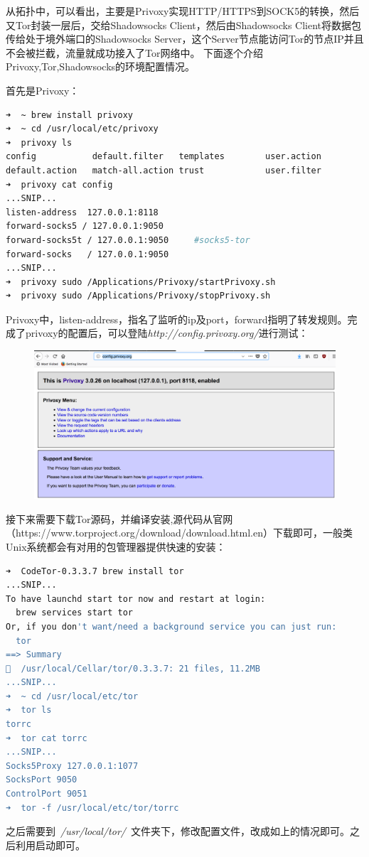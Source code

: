 \documentclass[12pt]{article}  %
\begin{document}
\par
从拓扑中，可以看出，主要是Privoxy实现HTTP/HTTPS到SOCK5的转换，然后又Tor封装一层后，交给Shadowsocks Client，然后由Shadowsocks Client将数据包传给处于境外端口的Shadowsocks Server，这个Server节点能访问Tor的节点IP并且不会被拦截，流量就成功接入了Tor网络中。
下面逐个介绍 Privoxy,Tor,Shadowsocks的环境配置情况。
\par
首先是Privoxy：
\begin{lstlisting}[language=sh]
➜  ~ brew install privoxy
➜  ~ cd /usr/local/etc/privoxy
➜  privoxy ls
config           default.filter   templates        user.action
default.action   match-all.action trust            user.filter
➜  privoxy cat config
...SNIP...
listen-address  127.0.0.1:8118
forward-socks5 / 127.0.0.1:9050
forward-socks5t / 127.0.0.1:9050     #socks5-tor
forward-socks   / 127.0.0.1:9050
...SNIP...
➜  privoxy sudo /Applications/Privoxy/startPrivoxy.sh
➜  privoxy sudo /Applications/Privoxy/stopPrivoxy.sh
\end{lstlisting}
\par
Privoxy中，listen-address，指名了监听的ip及port，forward指明了转发规则。完成了privoxy的配置后，可以登陆\emph{http://config.privoxy.org/}进行测试：
\begin{figure}[h]
\centering
\includegraphics[scale=0.3]{pic/privoxy.png}
\end{figure}
\par
接下来需要下载Tor源码，并编译安装,源代码从官网（https://www.torproject.org/download/download.html.en）下载即可，一般类Unix系统都会有对用的包管理器提供快速的安装：

\begin{lstlisting}[language=sh]
➜  CodeTor-0.3.3.7 brew install tor
...SNIP...
To have launchd start tor now and restart at login:
  brew services start tor
Or, if you don't want/need a background service you can just run:
  tor
==> Summary
🍺  /usr/local/Cellar/tor/0.3.3.7: 21 files, 11.2MB
...SNIP...
➜  ~ cd /usr/local/etc/tor
➜  tor ls
torrc
➜  tor cat torrc
...SNIP...
Socks5Proxy 127.0.0.1:1077
SocksPort 9050
ControlPort 9051
➜  tor -f /usr/local/etc/tor/torrc
\end{lstlisting}
\par
之后需要到\ \emph{/usr/local/tor/}\ 文件夹下，修改配置文件，改成如上的情况即可。之后利用启动即可。
\end{document}
